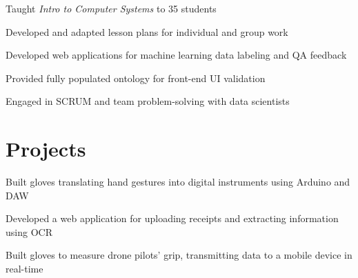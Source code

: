 \documentclass[]{resume-openfont}
\begin{document}
\begin{minipage}[t]{1\textwidth}
\begin{tightemize}
\item Taught {\it Intro to Computer Systems} to 35 students
\item Developed and adapted lesson plans for individual and group work
\end{tightemize}
\sectionsep

\begin{tightemize}
\item Developed web applications for machine learning data labeling and QA feedback
\item Provided fully populated ontology for front-end UI validation
\item Engaged in SCRUM and team problem-solving with data scientists
\end{tightemize}
\sectionsep

\vspace{-4 mm}
\section{Projects}
\titlerule
\vspace{2.5 mm}

Built gloves translating hand gestures into digital instruments using Arduino and DAW
\sectionsep

Developed a web application for uploading receipts and extracting information using OCR
\sectionsep

Built gloves to measure drone pilots' grip, transmitting data to a mobile device in real-time
\sectionsep

\end{minipage} 
\end{document}

